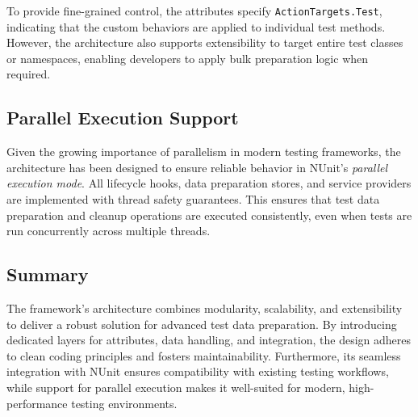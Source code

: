 To provide fine-grained control, the attributes specify \texttt{ActionTargets.Test}, indicating that the custom behaviors are applied to individual test methods. However, the architecture also supports extensibility to target entire test classes or namespaces, enabling developers to apply bulk preparation logic when required.

\subsection{Parallel Execution Support}
Given the growing importance of parallelism in modern testing frameworks, the architecture has been designed to ensure reliable behavior in NUnit's \textit{parallel execution mode}. All lifecycle hooks, data preparation stores, and service providers are implemented with thread safety guarantees. This ensures that test data preparation and cleanup operations are executed consistently, even when tests are run concurrently across multiple threads.

\subsection{Summary}
The framework's architecture combines modularity, scalability, and extensibility to deliver a robust solution for advanced test data preparation. By introducing dedicated layers for attributes, data handling, and integration, the design adheres to clean coding principles and fosters maintainability. Furthermore, its seamless integration with NUnit ensures compatibility with existing testing workflows, while support for parallel execution makes it well-suited for modern, high-performance testing environments.
